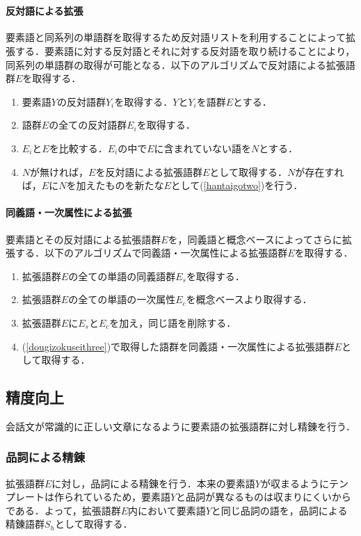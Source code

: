 \\
\paragraph{反対語による拡張}
要素語と同系列の単語群を取得するため反対語リストを利用することによって拡張する．要素語に対する反対語とそれに対する反対語を取り続けることにより，同系列の単語群の取得が可能となる．以下のアルゴリズムで反対語による拡張語群$E$を取得する．
\begin{enumerate}
	\item 要素語$Y$の反対語群$Y_i$を取得する．$Y$と$Y_i$を語群$E$とする．
	\item \label{hantaigotwo} 語群$E$の全ての反対語群$E_i$を取得する．
	\item $E_i$と$E$を比較する．$E_i$の中で$E$に含まれていない語を$N$とする．
	\item $N$が無ければ，$E$を反対語による拡張語群$E$として取得する．$N$が存在すれば，$E$に$N$を加えたものを新たな$E$として(\ref{hantaigotwo})を行う．
\end{enumerate}
\paragraph{同義語・一次属性による拡張}
要素語とその反対語による拡張語群$E$を，同義語と概念ベースによってさらに拡張する．以下のアルゴリズムで同義語・一次属性による拡張語群$E$を取得する．
\begin{enumerate}
	\item 拡張語群$E$の全ての単語の同義語群$E_s$を取得する．
	\item 拡張語群$E$の全ての単語の一次属性$E_c$を概念ベースより取得する．
	\item \label{dougizokuseithree} 拡張語群$E$に$E_s$と$E_c$を加え，同じ語を削除する．
	\item (\ref{dougizokuseithree})で取得した語群を同義語・一次属性による拡張語群$E$として取得する．
\end{enumerate}

\subsection{精度向上} \label{seidoup}
会話文が常識的に正しい文章になるように要素語の拡張語群に対し精錬を行う．
\subsubsection{品詞による精錬}
拡張語群$E$に対し，品詞による精錬を行う．本来の要素語$Y$が収まるようにテンプレートは作られているため，要素語$Y$と品詞が異なるものは収まりにくいからである．よって，拡張語群$E$内において要素語$Y$と同じ品詞の語を，品詞による精錬語群$S_h$として取得する．
